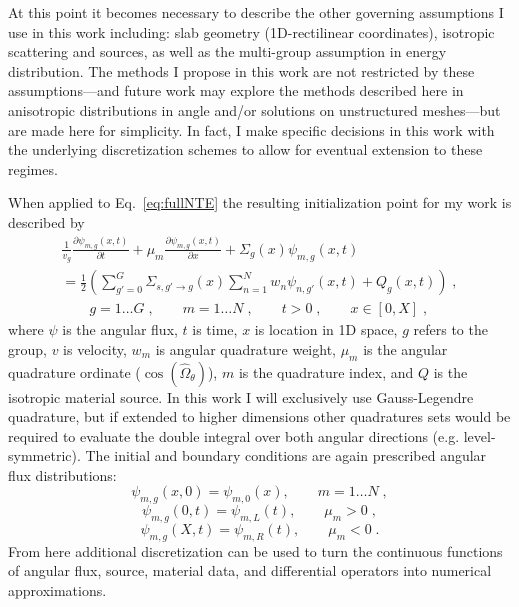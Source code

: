 At this point it becomes necessary to describe the other governing assumptions I use in this work including:
slab geometry (1D-rectilinear coordinates), isotropic scattering and sources, as well as the multi-group assumption in energy distribution.
The methods I propose in this work are not restricted by these assumptions---and future work may explore the methods described here in anisotropic distributions in angle and/or solutions on unstructured meshes---but are made here for simplicity.
In fact, I make specific decisions in this work with the underlying discretization schemes to allow for eventual extension to these regimes.

When applied to Eq.~\eqref{eq:fullNTE} the resulting initialization point for my work is described by
\begin{multline}
    \label{sn_nte_int}
    \frac{1}{v_g} \frac{\partial \psi_{m,g}(x,t)}{\partial t} + \mu_m \frac{\partial \psi_{m,g}(x,t)}{\partial x} + \Sigma_g(x) \psi_{m,g}(x,t)  \\
     = \frac{1}{2} \left( \sum\limits_{g' = 0}^G \Sigma_{s, g'\to g}(x) \sum\limits_{n=1}^N w_n \psi_{n, g'}(x,t) + Q_g(x,t) \right) \;, \\
    \qquad g=1 \ldots G \;, \qquad m=1 \ldots N \;, \qquad t > 0 \;, \qquad x \in [0,X] \;,
\end{multline}
where $\psi$ is the angular flux, $t$ is time, $x$ is location in 1D space, $g$ refers to the group, $v$ is velocity, $w_m$ is angular quadrature weight, $\mu_m$ is the angular quadrature ordinate ($\cos(\hat{\Omega}_\theta)$), $m$ is the quadrature index, and $Q$ is the isotropic material source.
In this work I will exclusively use Gauss-Legendre quadrature, but if extended to higher dimensions other quadratures sets would be required to evaluate the double integral over both angular directions (e.g. level-symmetric). 
The initial and boundary conditions are again prescribed angular flux distributions:
\begin{equation*}
    \psi_{m,g}(x,0) = \psi_{m,0}(x), \qquad m=1 \ldots N \;,
\end{equation*}
\begin{equation*}
    \psi_{m,g}(0,t) = \psi_{m,L}(t), \qquad \mu_m >0 \;,
\end{equation*}
\begin{equation*}
    \psi_{m,g}(X,t) = \psi_{m,R}(t), \qquad \mu_m <0 \;.
\end{equation*}
From here additional discretization can be used to turn the continuous functions of angular flux, source, material data, and differential operators into numerical approximations.

